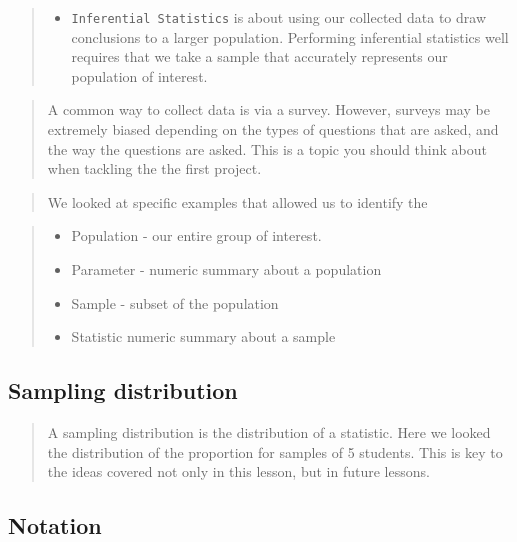 \documentclass[]{book}
\providecommand{\tightlist}{%
  \setlength{\itemsep}{0pt}\setlength{\parskip}{0pt}}
\begin{document}
\begin{quote}
\begin{itemize}
\tightlist
\item
  \texttt{Inferential\ Statistics} is about using our collected data to
  draw conclusions to a larger population. Performing inferential
  statistics well requires that we take a sample that accurately
  represents our population of interest.
\end{itemize}
\end{quote}

\begin{quote}
A common way to collect data is via a survey. However, surveys may be
extremely biased depending on the types of questions that are asked, and
the way the questions are asked. This is a topic you should think about
when tackling the the first project.
\end{quote}

\begin{quote}
We looked at specific examples that allowed us to identify the
\end{quote}

\begin{quote}
\begin{itemize}
\tightlist
\item
  Population - our entire group of interest.
\item
  Parameter - numeric summary about a population
\item
  Sample - subset of the population
\item
  Statistic numeric summary about a sample
\end{itemize}
\end{quote}

\subsection{Sampling distribution}\label{sampling-distribution}

\begin{quote}
A sampling distribution is the distribution of a statistic. Here we
looked the distribution of the proportion for samples of 5 students.
This is key to the ideas covered not only in this lesson, but in future
lessons.
\end{quote}

\subsection{Notation}\label{notation}
\end{document}
